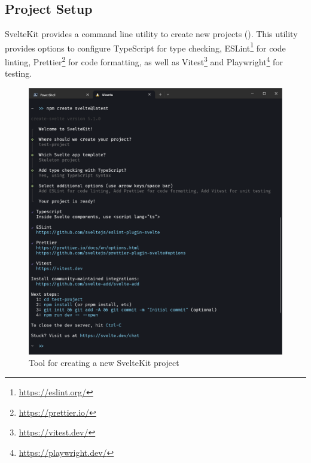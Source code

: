 

\subsection{Project Setup}
SvelteKit provides a command line utility to create new projects (). This utility provides options to configure TypeScript for type checking, ESLint\footnote{\url{https://eslint.org/}} for code linting, Prettier\footnote{\url{https://prettier.io/}} for code formatting, as well as Vitest\footnote{\url{https://vitest.dev/}} and Playwright\footnote{\url{https://playwright.dev/}} for testing. 


\begin{figure}
    \centering
    \includegraphics[width=.95\linewidth,trim={0 15cm 0 1.5cm},clip]{assets/sveltekit-project-setup}
    \caption{Tool for creating a new SvelteKit project}
    \label{fig:project-setup}
\end{figure}

